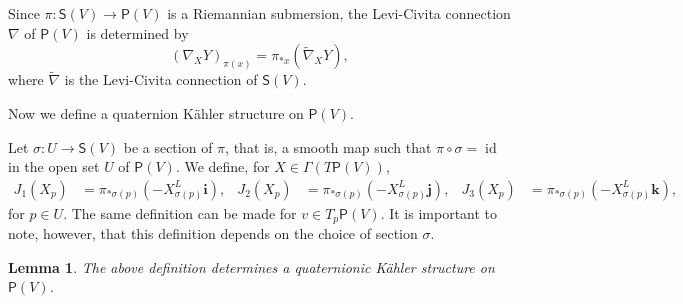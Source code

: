 \documentclass[12pt, a4paper]{amsart}
\newcommand{\id}{\operatorname{id}}
\newtheorem{lemma}[theorem]{Lemma}
\theoremstyle{remark}
\begin{document}
Since $\pi\colon\mathsf{S}(V)\to\mathsf{P}(V)$ is a Riemannian submersion, the Levi-Civita connection $\nabla$ of $\mathsf{P}(V)$ is determined by~\cite{ONeill}
\[
(\nabla_X Y)_{\pi(x)}=\pi_{*x}(\tilde{\nabla}_X Y),
\]
where $\tilde{\nabla}$ is the Levi-Civita connection of $\mathsf{S}(V)$.
\medskip

Now we define a quaternion K\"ahler structure on $\mathsf{P}(V)$.

Let $\sigma\colon U\to\mathsf{S}(V)$ be a section of $\pi$, that is, a smooth map such that $\pi\circ\sigma=\id$ in the open set $U$ of $\mathsf{P}(V)$.
We define, for $X\in\Gamma(T\mathsf{P}(V))$,
\[
\begin{aligned}
J_1(X_p)&{}=\pi_{*\sigma(p)}(-X_{\sigma(p)}^L\mathbf{i}),
&J_2(X_p)&{}=\pi_{*\sigma(p)}(-X_{\sigma(p)}^L\mathbf{j}),
&J_3(X_p)&{}=\pi_{*\sigma(p)}(-X_{\sigma(p)}^L\mathbf{k}),
\end{aligned}
\]
for $p\in U$.
The same definition can be made for $v\in T_p\mathsf{P}(V)$.
It is important to note, however, that this definition depends on the choice of section $\sigma$.

\begin{lemma}
The above definition determines a quaternionic K\"ahler structure on $\mathsf{P}(V)$.
\end{lemma}
\end{document}
